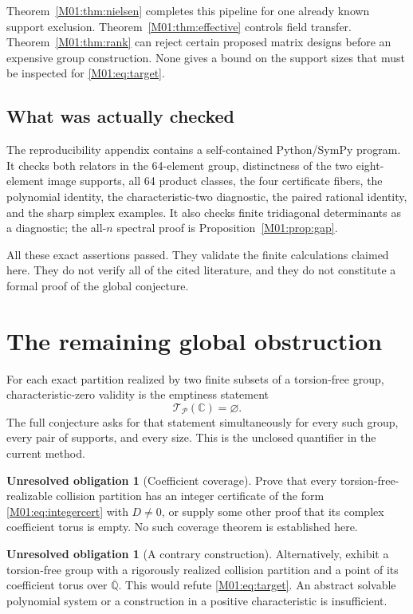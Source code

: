 \documentclass[11pt,a4paper,oneside]{report}
\theoremstyle{definition}
\newtheorem{problem}[theorem]{Unresolved obligation}
\theoremstyle{remark}
\newcommand{\C}{\mathbb C}
\newcommand{\Qbar}{\overline{\mathbb Q}}
\begin{document}
Theorem~\ref{M01:thm:nielsen} completes this pipeline for one already known
support exclusion. Theorem~\ref{M01:thm:effective} controls field transfer.
Theorem~\ref{M01:thm:rank} can reject certain proposed matrix designs before
an expensive group construction. None gives a bound on the support sizes
that must be inspected for \eqref{M01:eq:target}.

\subsection{What was actually checked}

The reproducibility appendix contains a self-contained Python/SymPy
program. It checks both relators in the 64-element group, distinctness of
the two eight-element image supports, all 64 product classes, the four
certificate fibers, the polynomial identity, the characteristic-two
diagnostic, the paired rational identity, and the sharp simplex examples.
It also checks finite tridiagonal determinants as a diagnostic; the
all-$n$ spectral proof is Proposition~\ref{M01:prop:gap}.

All these exact assertions passed. They validate the finite calculations
claimed here. They do not verify all of the cited literature, and they do
not constitute a formal proof of the global conjecture.

\section{The remaining global obstruction}\label{M01:sec:remaining}

For each exact partition realized by two finite subsets of a torsion-free
group, characteristic-zero validity is the emptiness statement
\[
\mathcal T_{\mathcal P}(\C)=\varnothing.
\]
The full conjecture asks for that statement simultaneously for every
such group, every pair of supports, and every size. This is the unclosed
quantifier in the current method.

\begin{problem}[Coefficient coverage]
Prove that every torsion-free-realizable collision partition has an
integer certificate of the form \eqref{M01:eq:integercert} with $D\ne0$,
or supply some other proof that its complex coefficient torus is empty.
No such coverage theorem is established here.
\end{problem}

\begin{problem}[A contrary construction]
Alternatively, exhibit a torsion-free group with a rigorously realized
collision partition and a point of its coefficient torus over $\Qbar$.
This would refute \eqref{M01:eq:target}. An abstract solvable polynomial
system or a construction in a positive characteristic is insufficient.
\end{problem}
\end{document}
